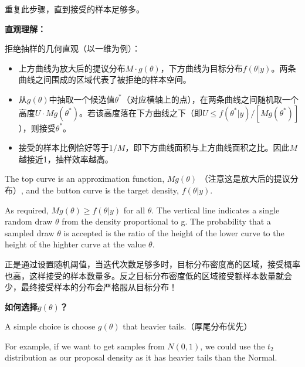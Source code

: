 \documentclass[
]{book}
\providecommand{\tightlist}{%
  \setlength{\itemsep}{0pt}\setlength{\parskip}{0pt}}
\begin{document}
重复此步骤，直到接受的样本足够多。

\textbf{直观理解：}

拒绝抽样的几何直观（以一维为例）：

\begin{itemize}
\tightlist
\item
  上方曲线为放大后的提议分布\(M \cdot g(\theta)\)，下方曲线为目标分布\(f(\theta|y)\)。两条曲线之间围成的区域代表了被拒绝的样本空间。
\item
  从\(g(\theta)\)中抽取一个候选值\(\theta^*\)（对应横轴上的点），在两条曲线之间随机取一个高度\(U \cdot M g(\theta^*)\)。若该高度落在下方曲线之下（即\(U \leq f(\theta^*|y) / [M g(\theta^*)]\)），则接受\(\theta^*\)。
\item
  接受的样本比例恰好等于\(1/M\)，即下方曲线面积与上方曲线面积之比。因此\(M\)越接近1，抽样效率越高。
\end{itemize}

The top curve is an approximation function, \(Mg(\theta)\) （注意这是放大后的提议分布）, and the button curve is the target density, \(f(\theta|y)\).

As required, \(Mg(\theta)\geq f(\theta|y)\) for all \(\theta\). The vertical line indicates a single random draw \(\theta\) from the density proportional to g. The probability that a sampled draw \(\theta\) is accepted is the ratio of the height of the lower curve to the height of the highter curve at the value \(\theta\).

正是通过设置随机阈值，当迭代次数足够多时，目标分布密度高的区域，接受概率也高，这样接受的样本数量多。反之目标分布密度低的区域接受额样本数量就会少，最终接受样本的分布会严格服从目标分布！

\textbf{如何选择}\(g(\theta)\)\textbf{？}

A simple choice is choose \(g(\theta)\) that heavier tails.（厚尾分布优先）

For example, if we want to get samples from \(N(0,1)\), we could use the \(t_2\) distribution as our proposal density as it has heavier tails than the Normal.
\end{document}
